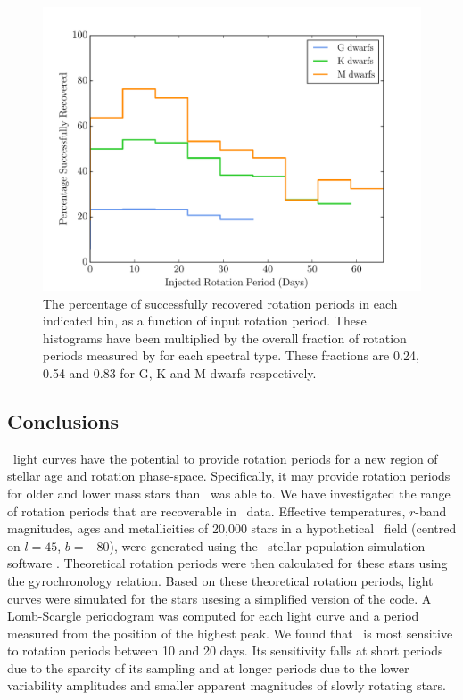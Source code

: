 \begin{figure}
\begin{center}
\includegraphics[width=6in, clip=true]{figures/recovered_hist_-10.pdf}
\caption[\LSST\ rotation period recovery results for different spectral types]
{The percentage of successfully recovered rotation periods in each indicated
bin, as a function of input rotation period.
These histograms have been multiplied by the overall fraction of rotation
periods measured by \citet{Mcquillan2014} for each spectral type.
These fractions are 0.24, 0.54 and 0.83 for G, K and M dwarfs respectively.}
\label{fig:kickass}
\end{center}
\end{figure}

\subsection{Conclusions}

\LSST\ light curves have the potential to provide rotation periods for a new
region of stellar age and rotation phase-space.
Specifically, it may provide rotation periods for older and lower mass stars
than \kepler\ was able to.
We have investigated the range of rotation periods that are recoverable in
\LSST\ data.
Effective temperatures, $r$-band magnitudes, ages and metallicities of 20,000
stars in a hypothetical \LSST\ field (centred on $l=45$, $b=-80$), were
generated using the \trilegal\ stellar population simulation software
\citep{Girardi2012}.
Theoretical rotation periods were then calculated for these stars using the
\citep{Angus2015} gyrochronology relation.
Based on these theoretical rotation periods, light curves were simulated for
the stars usesing a simplified version of the \citep{Aigrain2015} code.
A Lomb-Scargle periodogram was computed for each light curve and a period
measured from the position of the highest peak.
We found that \LSST\ is most sensitive to rotation periods between 10 and 20
days.
Its sensitivity falls at short periods due to the sparcity of its sampling and
at longer periods due to the lower variability amplitudes and smaller apparent
magnitudes of slowly rotating stars.

